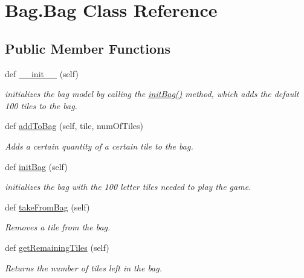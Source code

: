 \hypertarget{class_bag_1_1_bag}{}\section{Bag.\+Bag Class Reference}
\label{class_bag_1_1_bag}
\subsection*{Public Member Functions}
\begin{DoxyCompactItemize}
\item 
def \hyperlink{class_bag_1_1_bag_aaa334734b2050a511a28537952c68e02}{\+\_\+\+\_\+init\+\_\+\+\_\+} (self)
\begin{DoxyCompactList}\small\item\em initializes the bag model by calling the \hyperlink{class_bag_1_1_bag_ad9b292e02f119061e2a2e7f31eadf074}{init\+Bag()} method, which adds the default 100 tiles to the bag. \end{DoxyCompactList}\item 
def \hyperlink{class_bag_1_1_bag_afa203e93b2eb94451d16920b318a5e08}{add\+To\+Bag} (self, tile, num\+Of\+Tiles)
\begin{DoxyCompactList}\small\item\em Adds a certain quantity of a certain tile to the bag. \end{DoxyCompactList}\item 
def \hyperlink{class_bag_1_1_bag_ad9b292e02f119061e2a2e7f31eadf074}{init\+Bag} (self)
\begin{DoxyCompactList}\small\item\em initializes the bag with the 100 letter tiles needed to play the game. \end{DoxyCompactList}\item 
def \hyperlink{class_bag_1_1_bag_ae042107d5d97af68350a987ce34b2cf1}{take\+From\+Bag} (self)
\begin{DoxyCompactList}\small\item\em Removes a tile from the bag. \end{DoxyCompactList}\item 
def \hyperlink{class_bag_1_1_bag_acfe00e02e1c1f551f6e6855de45afb6d}{get\+Remaining\+Tiles} (self)
\begin{DoxyCompactList}\small\item\em Returns the number of tiles left in the bag. \end{DoxyCompactList}\end{DoxyCompactItemize}
